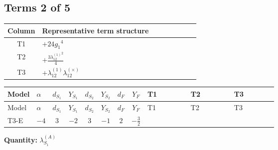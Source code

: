 \documentclass[8pt]{article}
\begin{document}
\begin{landscape}
\subsection*{Terms 2 of 5}
\begin{center}
\begin{tabular}{@{}c >{\raggedright\arraybackslash}p{0.82\linewidth}@{}}
\toprule
Column & Representative term structure \\
\midrule
T1 & \(\displaystyle +24 {g_1}^4\) \\
\midrule
T2 & \(\displaystyle +\frac{3 {\lambda_{12}^{(1)}}^2}{4}\) \\
\midrule
T3 & \(\displaystyle +{\lambda_{12}^{(1)}} {\lambda_{12}^{(\times)}}\) \\
\midrule
\bottomrule
\end{tabular}
\end{center}
\smallskip
\tiny
\begin{longtable}{@{}llcccccc >{\raggedright\arraybackslash}p{0.21\linewidth} >{\raggedright\arraybackslash}p{0.21\linewidth} >{\raggedright\arraybackslash}p{0.21\linewidth}@{}}
\toprule
Model & $\alpha$ & $d_{S_1}$ & $Y_{S_1}$ & $d_{S_2}$ & $Y_{S_2}$ & $d_F$ & $Y_F$ & T1 & T2 & T3 \\
\midrule
\endfirsthead
\toprule
Model & $\alpha$ & $d_{S_1}$ & $Y_{S_1}$ & $d_{S_2}$ & $Y_{S_2}$ & $d_F$ & $Y_F$ & T1 & T2 & T3 \\
\midrule
\endhead
T3-E & $-4$ & $3$ & $-2$ & $3$ & $-1$ & $2$ & $-\frac{3}{2}$ & \scriptsize\adjustbox{max width=\linewidth}{$\begin{gathered} +24 {g_1}^4\end{gathered}$} & \scriptsize\adjustbox{max width=\linewidth}{$\begin{gathered} +\frac{3 {\lambda_{12}^{(1)}}^2}{4}\end{gathered}$} & \scriptsize\adjustbox{max width=\linewidth}{$\begin{gathered} +{\lambda_{12}^{(1)}} {\lambda_{12}^{(\times)}}\end{gathered}$} \\
\midrule
\bottomrule
\end{longtable}
\clearpage
\noindent\textbf{Quantity: }$\lambda_{S_1}^{(A)}$\par\smallskip

\end{landscape}
\end{document}
